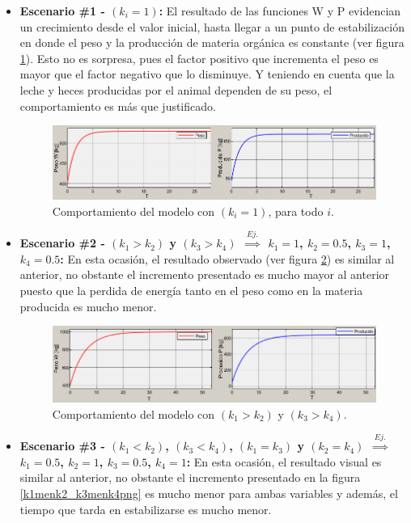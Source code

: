 \begin{itemize}
    \item \textbf{Escenario \#1 - $(k_{i}=1)$:} El resultado de las funciones W y P evidencian un crecimiento desde el valor inicial, hasta llegar a un punto de estabilización en donde el peso y la producción de materia orgánica es constante (ver figura \ref{igualkipng}). Esto no es sorpresa, pues el factor positivo que incrementa el peso es mayor que el factor negativo que  lo disminuye. Y teniendo en cuenta que la leche y heces producidas por el animal dependen de su peso, el comportamiento es más que justificado.
    
        \begin{figure}[H]
        	 \centering
        	 \includegraphics[scale=0.75]{img/igualki.png}
        	 \caption{Comportamiento del modelo con $(k_{i}=1)$, para todo $i$. \label{igualkipng}}
        \end{figure}
    
    \item \textbf{Escenario \#2 - $(k_{1}>k_{2})$ y $(k_{3}>k_{4})$ $\overset{Ej.}{\implies}$ $k_{1}=1$, $k_{2}=0.5$, $k_{3}=1$, $k_{4}=0.5$:} En esta ocasión, el resultado observado (ver figura \ref{k1Mk2_k3Mk4png}) es similar al anterior, no obstante el incremento presentado es mucho mayor al anterior puesto que la perdida de energía tanto en el peso como en la materia producida es mucho menor.

        \begin{figure}[H]
        	 \centering
        	 \includegraphics[scale=0.7750]{img/k1Mk2_k3Mk4.png}
        	 \caption{Comportamiento del modelo con $(k_{1}>k_{2})$ y $(k_{3}>k_{4})$. \label{k1Mk2_k3Mk4png}}
        \end{figure}
        
    \item \textbf{Escenario \#3 - $(k_{1}<k_{2})$, $(k_{3}<k_{4})$, $(k_{1}=k_{3})$ y $(k_{2}=k_{4})$ $\overset{Ej.}{\implies}$ $k_{1}=0.5$, $k_{2}=1$, $k_{3}=0.5$, $k_{4}=1$:} En esta ocasión, el resultado visual es similar al anterior, no obstante el incremento presentado en la figura \ref{k1menk2_k3menk4png} es mucho menor  para ambas variables y además, el tiempo que tarda en estabilizarse es mucho menor.


\end{itemize}
